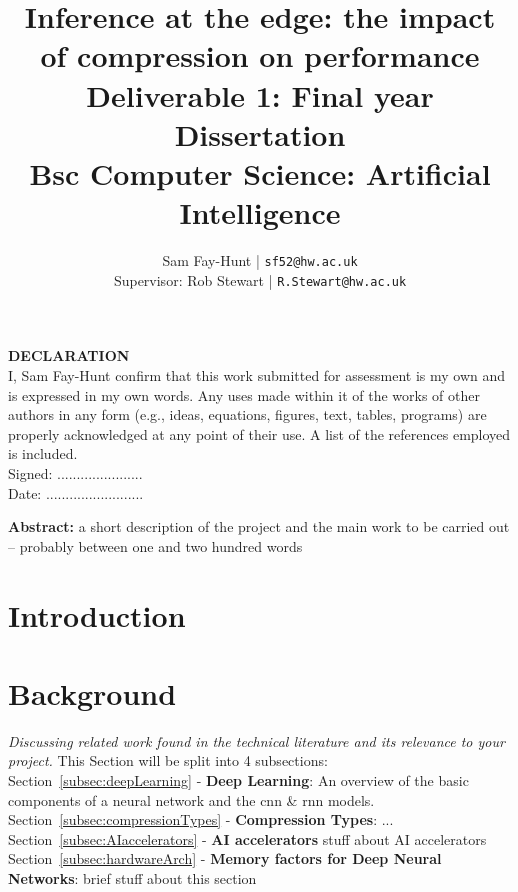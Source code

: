 \documentclass[11pt]{article}
\begin{document}
\title{%
	\bf Inference at the edge: the impact of compression on performance\\ 
	\large Deliverable 1: Final year Dissertation \\
	Bsc Computer Science: Artificial Intelligence}

\author{
	Sam Fay-Hunt | \texttt{sf52@hw.ac.uk}\\
	Supervisor: Rob Stewart | \texttt{R.Stewart@hw.ac.uk}
}

\maketitle
\thispagestyle{empty}
\pagebreak

\textbf{DECLARATION}\\
I, Sam Fay-Hunt confirm that this work submitted for assessment is my own and is expressed in
my own words. Any uses made within it of the works of other authors in any form (e.g., ideas,
equations, figures, text, tables, programs) are properly acknowledged at any point of their
use. A list of the references employed is included.\\
Signed: ......................\\
Date: .........................
\thispagestyle{empty}
\pagebreak

\textbf{Abstract:} a short description of the project and the main work to be carried out – probably
between one and two hundred words
\thispagestyle{empty}
\pagebreak

\tableofcontents
\thispagestyle{empty}
\pagebreak


\setcounter{page}{1}

\section{Introduction}


\pagebreak
\section{Background}
\emph{Discussing related work found in the technical literature and its relevance to your project.}
This Section will be split into 4 subsections:\\
Section~\ref{subsec:deepLearning} - \textbf{Deep Learning}: An overview of the basic components of a neural network and the \acrshort{cnn} \& \acrshort{rnn} models.\\
Section~\ref{subsec:compressionTypes} - \textbf{Compression Types}: ...\\
Section~\ref{subsec:AIaccelerators} - \textbf{AI accelerators} stuff about AI accelerators\\
Section~\ref{subsec:hardwareArch} - \textbf{Memory factors for Deep Neural Networks}: brief stuff about this section
\end{document}
